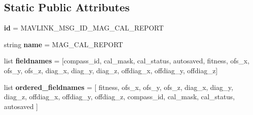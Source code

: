 \subsection*{Static Public Attributes}
\begin{DoxyCompactItemize}
\item 
\mbox{\label{classpymavlink_1_1dialects_1_1v10_1_1MAVLink__mag__cal__report__message_adf7b9aa7fd27bdce520ddf6770adb121}} 
{\bfseries id} = M\+A\+V\+L\+I\+N\+K\+\_\+\+M\+S\+G\+\_\+\+I\+D\+\_\+\+M\+A\+G\+\_\+\+C\+A\+L\+\_\+\+R\+E\+P\+O\+RT
\item 
\mbox{\label{classpymavlink_1_1dialects_1_1v10_1_1MAVLink__mag__cal__report__message_a3521ac5c7d6da40f727222998887c695}} 
string {\bfseries name} = \textquotesingle{}M\+A\+G\+\_\+\+C\+A\+L\+\_\+\+R\+E\+P\+O\+RT\textquotesingle{}
\item 
\mbox{\label{classpymavlink_1_1dialects_1_1v10_1_1MAVLink__mag__cal__report__message_a2b733d9bb28ff0b7fec6514dc3c5cfeb}} 
list {\bfseries fieldnames} = \mbox{[}\textquotesingle{}compass\+\_\+id\textquotesingle{}, \textquotesingle{}cal\+\_\+mask\textquotesingle{}, \textquotesingle{}cal\+\_\+status\textquotesingle{}, \textquotesingle{}autosaved\textquotesingle{}, \textquotesingle{}fitness\textquotesingle{}, \textquotesingle{}ofs\+\_\+x\textquotesingle{}, \textquotesingle{}ofs\+\_\+y\textquotesingle{}, \textquotesingle{}ofs\+\_\+z\textquotesingle{}, \textquotesingle{}diag\+\_\+x\textquotesingle{}, \textquotesingle{}diag\+\_\+y\textquotesingle{}, \textquotesingle{}diag\+\_\+z\textquotesingle{}, \textquotesingle{}offdiag\+\_\+x\textquotesingle{}, \textquotesingle{}offdiag\+\_\+y\textquotesingle{}, \textquotesingle{}offdiag\+\_\+z\textquotesingle{}\mbox{]}
\item 
\mbox{\label{classpymavlink_1_1dialects_1_1v10_1_1MAVLink__mag__cal__report__message_a848fb309e1a105339256e4d99abcf798}} 
list {\bfseries ordered\+\_\+fieldnames} = \mbox{[} \textquotesingle{}fitness\textquotesingle{}, \textquotesingle{}ofs\+\_\+x\textquotesingle{}, \textquotesingle{}ofs\+\_\+y\textquotesingle{}, \textquotesingle{}ofs\+\_\+z\textquotesingle{}, \textquotesingle{}diag\+\_\+x\textquotesingle{}, \textquotesingle{}diag\+\_\+y\textquotesingle{}, \textquotesingle{}diag\+\_\+z\textquotesingle{}, \textquotesingle{}offdiag\+\_\+x\textquotesingle{}, \textquotesingle{}offdiag\+\_\+y\textquotesingle{}, \textquotesingle{}offdiag\+\_\+z\textquotesingle{}, \textquotesingle{}compass\+\_\+id\textquotesingle{}, \textquotesingle{}cal\+\_\+mask\textquotesingle{}, \textquotesingle{}cal\+\_\+status\textquotesingle{}, \textquotesingle{}autosaved\textquotesingle{} \mbox{]}

\end{DoxyCompactItemize}
